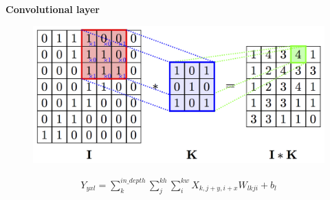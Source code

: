\documentclass[xcolor=dvipsnames]{beamer}
\begin{document}
\begin{frame}{\bf Convolutional layer}


\begin{figure}
  \includegraphics[scale=0.8]{../../diagrams/nn/convolution_2d.png}
\end{figure}

\begin{align*}
    Y_{yxl} = \sum_{k}^{in\_depth}\sum_{j}^{kh}\sum_{i}^{kw} X_{k, j+y, i+x}W_{lkji} + b_l
\end{align*}

\end{frame}
\end{document}
